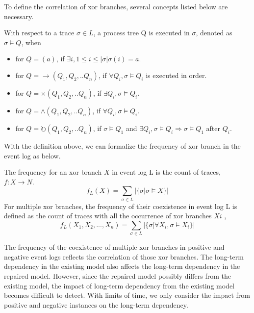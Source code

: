 To define the correlation of xor branches, several concepts listed below are necessary. 
\begin{definition}
	With respect to a trace $\sigma \in L$, a process tree Q is executed in $\sigma$, denoted as $\sigma \models Q$, when
		\begin{itemize}
		\item for $Q=(a)$, if $\exists i, 1 \leq i \leq |\sigma| \sigma(i)=a$.
		\item for $Q= \rightarrow(Q_1 , Q_2 ,.. Q_n)$, if $\forall Q_i, \sigma \models Q_i$ is executed in order.
		\item for $Q= \times(Q_1 , Q_2 ,.. Q_n)$,  if $\exists Q_i, \sigma \models Q_i$.
		\item for $Q= \land (Q_1 , Q_2 ,.. Q_n)$, if $\forall Q_i, \sigma \models Q_i$.
		\item for $Q= \circlearrowright(Q_1 , Q_2 ,.. Q_n)$,  if $ \sigma \models Q_1$ and $\exists Q_i, \sigma \models Q_i \Rightarrow  \sigma \models Q_1$ after $Q_i$.
	\end{itemize} 
\end{definition}
With the definition above, we can formalize the frequency of xor branch in the event log as below.
\begin{definition}
	The frequency for an xor branch $X$ in event log L is the count of traces, $f: X \rightarrow N$.   
	\[f_{L}(X) = \sum_{\sigma \in L} |\{\sigma \vert \sigma \models X\} |\]
	For multiple xor branches, the frequency of their coexistence in event log L is defined as the count of traces with all the occurrence of xor branches ${Xi}$ , \[f_{L}(X_1, X_2,...,X_n)= \sum_{\sigma \in L} |\{\sigma \vert \forall X_i, \sigma \models X_i\} | \]
\end{definition}
The frequency of the coexistence of multiple xor branches in positive and negative event logs reflects the correlation of those xor branches. The long-term dependency in the existing model also affects the long-term dependency in the repaired model. However, since the repaired model possibly differs from the existing model, the impact of long-term dependency from the existing model becomes difficult to detect. With limits of time, we only consider the impact from positive and negative instances on the long-term dependency.
